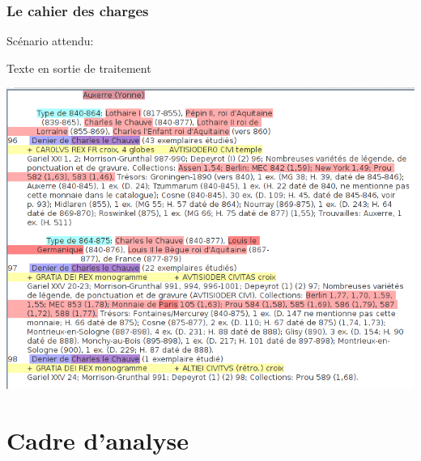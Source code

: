 \documentclass[10pt, compress]{beamer}
\begin{document}
\begin{frame}[fragile]
	\frametitle{Le cahier des charges}
	Scénario attendu:
	\begin{scriptsize}
	Texte en sortie de traitement
	\end{scriptsize}
	\includegraphics[scale=0.3]{img/afteran.png}
\end{frame}

\section{Cadre d'analyse}
\end{document}
